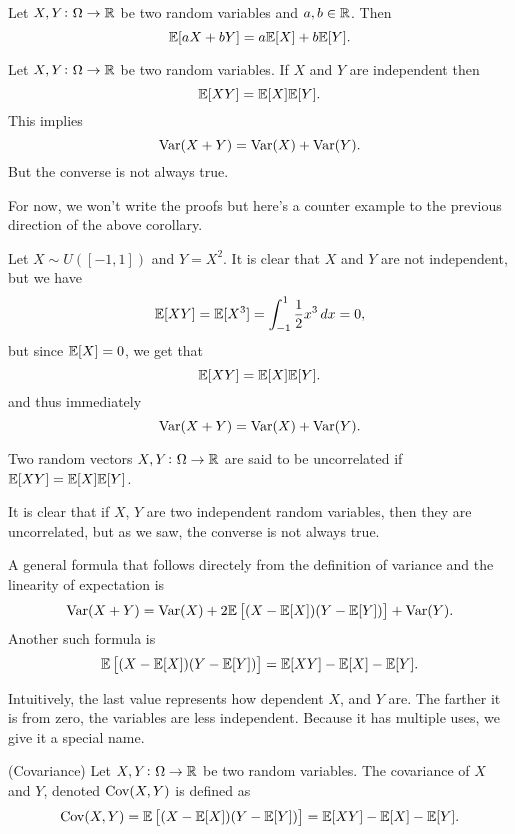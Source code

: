 \documentclass[11pt,a4paper]{article}
\begin{document}
  \begin{corollary}
    Let $X,Y \colon \Omega \to \mathbb{R}$ be two random variables and $a,b \in \mathbb{R}$.
    Then
    \[
      \mathbb{E}[aX + bY] = a \mathbb{E}[X] + b \mathbb{E}[Y].
    \]
  \end{corollary}

  \begin{corollary}
    Let $X,Y \colon \Omega \to \mathbb{R}$ be two random variables.
    If $X$ and $Y$ are independent then
    \[
      \mathbb{E}[XY] = \mathbb{E}[X] \mathbb{E}[Y].
    \]
    This implies
    \[
      \operatorname{Var}(X + Y) = \operatorname{Var}(X) + \operatorname{Var}(Y).
    \]
    But the converse is not always true.
  \end{corollary}

  For now, we won't write the proofs but here's a counter example to
  the previous direction of the above corollary.

  \begin{example}
    Let $X \sim U([-1,1])$ and $Y = X^2$. It is clear that $X$ and $Y$
    are not independent, but we have
    \[
      \mathbb{E}[XY] =
      \mathbb{E}[X^3] =
      \int_{-1}^{1} \frac{1}{2} x^3\,dx =
      0,
    \]
    but since $\mathbb{E}[X] = 0$, we get that
    \[
      \mathbb{E}[XY] = \mathbb{E}[X] \mathbb{E}[Y].
    \]
    and thus immediately
    \[
      \operatorname{Var}(X + Y) = \operatorname{Var}(X) + \operatorname{Var}(Y).
    \]
  \end{example}

  \begin{definition}[Uncorrelatedness]
    Two random vectors $X,Y \colon \Omega \to \mathbb{R}$ are said to be
    uncorrelated if $\mathbb{E}[XY] = \mathbb{E}[X] \mathbb{E}[Y]$.
  \end{definition}

  It is clear that if $X$, $Y$ are two independent random variables, then
  they are uncorrelated, but as we saw, the converse is not always true.

  A general formula that follows directely from the definition of variance
  and the linearity of expectation is
  \[
    \operatorname{Var}(X + Y) =
    \operatorname{Var}(X) + 
    2 \mathbb{E} \left[ (X - \mathbb{E}[X])(Y - \mathbb{E}[Y]) \right] +
    \operatorname{Var}(Y).
  \]
  Another such formula is
  \[
    \mathbb{E} \left[(X - \mathbb{E}[X])(Y - \mathbb{E}[Y])\right] =
    \mathbb{E}[XY] - \mathbb{E}[X] - \mathbb{E}[Y].
  \]

  Intuitively, the last value represents how dependent $X$, and $Y$ are.
  The farther it is from zero, the variables are less independent.
  Because it has multiple uses, we give it a special name.

  \begin{definition}(Covariance)
    Let $X,Y \colon \Omega \to \mathbb{R}$ be two random variables.
    The covariance of $X$ and $Y$, denoted $\operatorname{Cov}(X,Y)$ is defined
    as
    \[
      \operatorname{Cov}(X,Y) =
      \mathbb{E} \left[(X - \mathbb{E}[X])(Y - \mathbb{E}[Y])\right] =
      \mathbb{E}[XY] - \mathbb{E}[X] - \mathbb{E}[Y].
    \]
  \end{definition}
  
\end{document}
